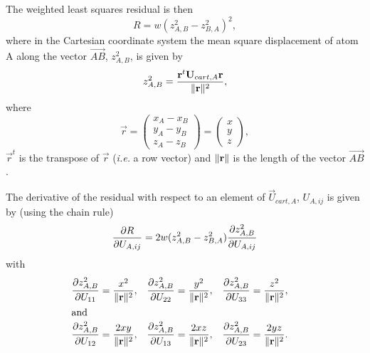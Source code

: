 \documentclass[12pt]{article}
\begin{document}
The weighted least squares residual is then
\begin{equation}
R = w(z^2_{A,B} - z^2_{B,A})^2,
\end{equation}
where in the Cartesian coordinate system the mean square displacement of atom A
along the vector $\overrightarrow{AB}$, $z^2_{A,B}$, is given by
\begin{equation}
z^2_{A,B} = \frac{\mathbf{r}^t\mathbf{U}_{cart,A}\mathbf{r}}{\| \mathbf{r} \|^2},
\end{equation}
where
\begin{equation}
\vec{r} = \begin{pmatrix} x_A - x_B\\y_A - y_B\\z_A - z_B \end{pmatrix}
= \begin{pmatrix} x\\y\\z \end{pmatrix},
\end{equation}
$\vec{r}^t$ is the transpose of $\vec{r}$ (\textit{i.e.} a row vector) and
$\| \mathbf{r} \|$ is the length of the vector $\overrightarrow{AB}$.

The derivative of the residual with respect to an element of $\vec{U}_{cart,A}$,
$U_{A,ij}$ is given by (using the chain rule)
\begin{equation}
\frac{\partial R}{\partial U_{A,ij}} 
=2w(z^2_{A,B} - z^2_{B,A}) \frac{\partial z^2_{A,B}}{\partial U_{A,ij}}\label{eqn:u_derivative}
\end{equation}
with
\begin{align}
\frac{\partial z^2_{A,B}}{\partial U_{11}} &= \frac{x^2}{\| \mathbf{r} \|^2} ,&
\frac{\partial z^2_{A,B}}{\partial U_{22}} &= \frac{y^2}{\| \mathbf{r} \|^2} ,&
\frac{\partial z^2_{A,B}}{\partial U_{33}} &= \frac{z^2}{\| \mathbf{r} \|^2} ,&
\\
\intertext{and}
\frac{\partial z^2_{A,B}}{\partial U_{12}} &= \frac{2xy}{\| \mathbf{r} \|^2} ,&
\frac{\partial z^2_{A,B}}{\partial U_{13}} &= \frac{2xz}{\| \mathbf{r} \|^2} ,&
\frac{\partial z^2_{A,B}}{\partial U_{23}} &= \frac{2yz}{\| \mathbf{r} \|^2} .
\end{align}


\end{document}
